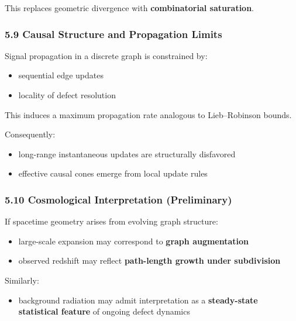 \documentclass[
]{article}
\providecommand{\tightlist}{%
  \setlength{\itemsep}{0pt}\setlength{\parskip}{0pt}}
\begin{document}
This replaces geometric divergence with \textbf{combinatorial
saturation}.

\hypertarget{causal-structure-and-propagation-limits}{%
\subsubsection{5.9 Causal Structure and Propagation
Limits}\label{causal-structure-and-propagation-limits}}

Signal propagation in a discrete graph is constrained by:

\begin{itemize}
\tightlist
\item
  sequential edge updates
\item
  locality of defect resolution
\end{itemize}

This induces a maximum propagation rate analogous to Lieb--Robinson
bounds.

Consequently:

\begin{itemize}
\tightlist
\item
  long-range instantaneous updates are structurally disfavored
\item
  effective causal cones emerge from local update rules
\end{itemize}

\hypertarget{cosmological-interpretation-preliminary}{%
\subsubsection{5.10 Cosmological Interpretation
(Preliminary)}\label{cosmological-interpretation-preliminary}}

If spacetime geometry arises from evolving graph structure:

\begin{itemize}
\tightlist
\item
  large-scale expansion may correspond to \textbf{graph augmentation}
\item
  observed redshift may reflect \textbf{path-length growth under
  subdivision}
\end{itemize}

Similarly:

\begin{itemize}
\tightlist
\item
  background radiation may admit interpretation as a
  \textbf{steady-state statistical feature} of ongoing defect dynamics
\end{itemize}
\end{document}
